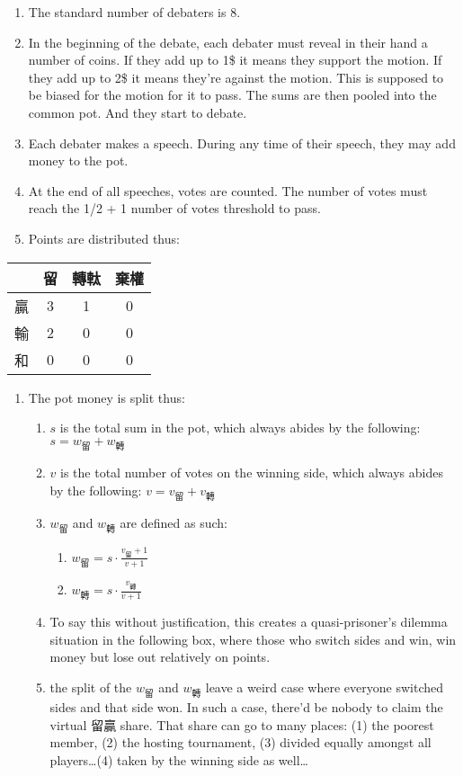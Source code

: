 \documentclass[9pt]{article}
\begin{document}
\begin{enumerate}
    \item The standard number of debaters is 8.
    \item In the beginning of the debate, each debater must reveal in their hand a number of coins. If they add up to 1\$ it means they support the motion. If they add up to 2\$ it means they're against the motion. This is supposed to be biased for the motion for it to pass. The sums are then pooled into the common pot. And they start to debate.
    \item Each debater makes a speech. During any time of their speech, they may add money to the pot.
    \item At the end of all speeches, votes are counted. The number of votes must reach the 1/2 + 1 number of votes threshold to pass.
    \item Points are distributed thus:
\end{enumerate}

\begin{table}[h]
\centering
\begin{tabular}{l|ccc}
\toprule
 & 留 & 轉軚 & 棄權 \\
\midrule
贏 & 3 & 1 & 0 \\
輸 & 2 & 0 & 0 \\
和 & 0 & 0 & 0 \\
\bottomrule
\end{tabular}
\end{table}

\begin{enumerate}
    \item The pot money is split thus:
    \begin{enumerate}
        \item $s$ is the total sum in the pot, which always abides by the following: $s = w_{\text{留}} + w_{\text{轉}}$
        \item $v$ is the total number of votes on the winning side, which always abides by the following: $v = v_{\text{留}} + v_{\text{轉}}$
        \item $w_{\text{留}}$ and $w_{\text{轉}}$ are defined as such:
        \begin{enumerate}
            \item $w_{\text{留}} = s \cdot \frac{v_{\text{留}}+1}{v+1}$
            \item $w_{\text{轉}} = s \cdot \frac{v_{\text{轉}}}{v+1}$
        \end{enumerate}
        \item To say this without justification, this creates a quasi-prisoner's dilemma situation in the following box, where those who switch sides and win, win money but lose out relatively on points.
        \item the split of the $w_{\text{留}}$ and $w_{\text{轉}}$ leave a weird case where everyone switched sides and that side won. In such a case, there'd be nobody to claim the virtual 留贏 share. That share can go to many places: (1) the poorest member, (2) the hosting tournament, (3) divided equally amongst all players\ldots (4) taken by the winning side as well\ldots
    \end{enumerate}
\end{enumerate}
\end{document}
